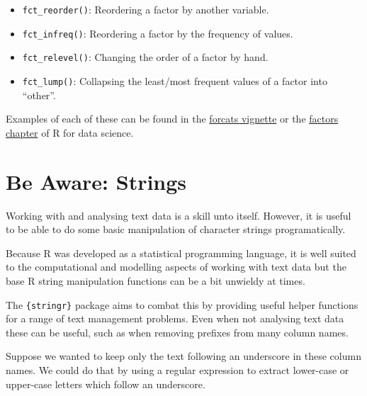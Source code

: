 \documentclass[
  letterpaper,
  DIV=11,
  numbers=noendperiod]{scrreprt}
\providecommand{\tightlist}{%
  \setlength{\itemsep}{0pt}\setlength{\parskip}{0pt}}\usepackage{longtable,booktabs,array}
\begin{document}
\begin{itemize}
\tightlist
\item
  \texttt{fct\_reorder()}: Reordering a factor by another variable.
\item
  \texttt{fct\_infreq()}: Reordering a factor by the frequency of
  values.
\item
  \texttt{fct\_relevel()}: Changing the order of a factor by hand.
\item
  \texttt{fct\_lump()}: Collapsing the least/most frequent values of a
  factor into ``other''.
\end{itemize}

Examples of each of these can be found in the
\href{https://forcats.tidyverse.org/articles/forcats.html}{forcats
vignette} or the \href{(https://r4ds.had.co.nz/factors.html)}{factors
chapter} of R for data science.

\section{Be Aware: Strings}\label{be-aware-strings}

Working with and analysing text data is a skill unto itself. However, it
is useful to be able to do some basic manipulation of character strings
programatically.

Because R was developed as a statistical programming language, it is
well suited to the computational and modelling aspects of working with
text data but the base R string manipulation functions can be a bit
unwieldy at times.

The \texttt{\{stringr\}} package aims to combat this by providing useful
helper functions for a range of text management problems. Even when not
analysing text data these can be useful, such as when removing prefixes
from many column names.

Suppose we wanted to keep only the text following an underscore in these
column names. We could do that by using a regular expression to extract
lower-case or upper-case letters which follow an underscore.
\end{document}
